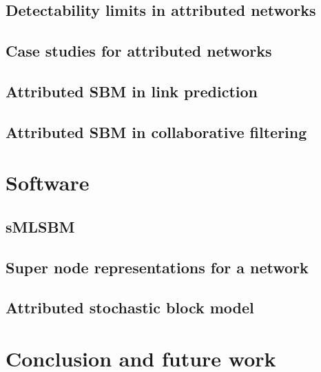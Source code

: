 \section{Detectability limits in attributed networks}
\section{Case studies for attributed networks}
\section{Attributed SBM in link prediction}
\section{Attributed SBM in collaborative filtering}

\chapter{Software}
\section{sMLSBM}
\section{Super node representations for a network}
\section{Attributed stochastic block model}

\chapter{Conclusion and future work}





